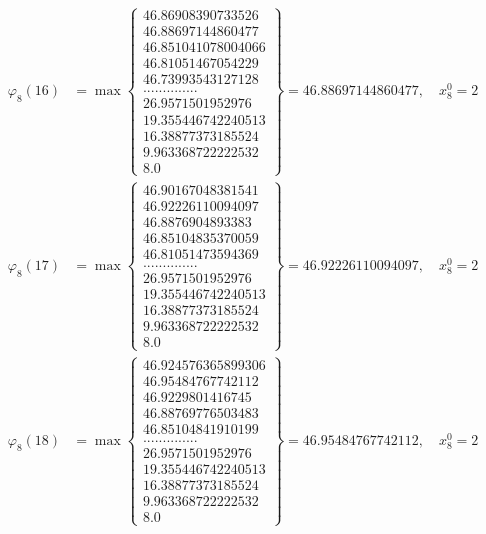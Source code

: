 \documentclass{article}
\begin{document}
\begin{align*}
  
  
  
\varphi_{8}(16) &= \max \left\{ \begin{array}{c}
46.86908390733526 \\
 46.88697144860477 \\
 46.851041078004066 \\
 46.81051467054229 \\
 46.73993543127128 \\
 .............. \\
 26.9571501952976 \\
 19.355446742240513 \\
 16.38877373185524 \\
 9.963368722222532 \\
 8.0
\end{array} \right\} = 46.88697144860477, \quad x_{8}^0 = 2\\
  
  
  
  
\varphi_{8}(17) &= \max \left\{ \begin{array}{c}
46.90167048381541 \\
 46.92226110094097 \\
 46.8876904893383 \\
 46.85104835370059 \\
 46.81051473594369 \\
 .............. \\
 26.9571501952976 \\
 19.355446742240513 \\
 16.38877373185524 \\
 9.963368722222532 \\
 8.0
\end{array} \right\} = 46.92226110094097, \quad x_{8}^0 = 2\\
  
  
  
  
\varphi_{8}(18) &= \max \left\{ \begin{array}{c}
46.924576365899306 \\
 46.95484767742112 \\
 46.9229801416745 \\
 46.88769776503483 \\
 46.85104841910199 \\
 .............. \\
 26.9571501952976 \\
 19.355446742240513 \\
 16.38877373185524 \\
 9.963368722222532 \\
 8.0
\end{array} \right\} = 46.95484767742112, \quad x_{8}^0 = 2\\
  

\end{align*}
\end{document}
